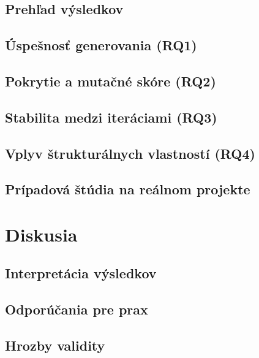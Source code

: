 \subsection{Prehľad výsledkov}\label{sec:prehlad}

\subsection{Úspešnosť generovania (RQ1)}\label{sec:rq1}
\subsection{Pokrytie a mutačné skóre (RQ2)}\label{sec:rq2}
\subsection{Stabilita medzi iteráciami (RQ3)}\label{sec:rq3}
\subsection{Vplyv štrukturálnych vlastností (RQ4)}\label{sec:rq4}
\subsection{Prípadová štúdia na reálnom projekte}\label{sec:pripadova}

\section{Diskusia}\label{sec:diskusia}

\subsection{Interpretácia výsledkov}\label{sec:interpretacia}

\subsection{Odporúčania pre prax}\label{sec:odporucania}

\subsection{Hrozby validity}\label{sec:validita}
